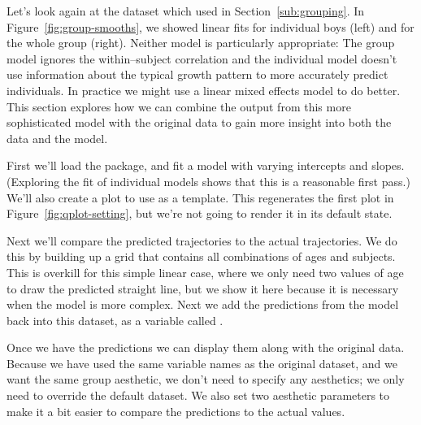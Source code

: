 Let's look again at the  dataset which used in Section~\ref{sub:grouping}.  In Figure~\ref{fig:group-smooths}, we showed linear fits for individual boys (left) and for the whole group (right).  Neither model is particularly appropriate: The group model ignores the within--subject correlation and the individual model doesn't use information about the typical growth pattern to more accurately predict individuals.  In practice we might use a linear mixed effects model to do better.  This section explores how we can combine the output from this more sophisticated model with the original data to gain more insight into both the data and the model.

First we'll load the  package, and fit a model with varying intercepts and slopes.  (Exploring the fit of individual models shows that this is a reasonable first pass.)  We'll also create a plot to use as a template.  This regenerates the first plot in Figure~\ref{fig:qplot-setting}, but we're not going to render it in its default state.

% 


Next we'll compare the predicted trajectories to the actual trajectories.  We do this by building up a grid that contains all combinations of ages and subjects.  This is overkill for this simple linear case, where we only need two values of age to draw the predicted straight line, but we show it here because it is necessary when the model is more complex.  Next we add the predictions from the model back into this dataset, as a variable called .  

% 
% 


Once we have the predictions we can display them along with the original data.  Because we have used the same variable names as the original  dataset, and we want the same group aesthetic, we don't need to specify any aesthetics; we only need to override the default dataset.  We also set two aesthetic parameters to make it a bit easier to compare the predictions to the actual values.

